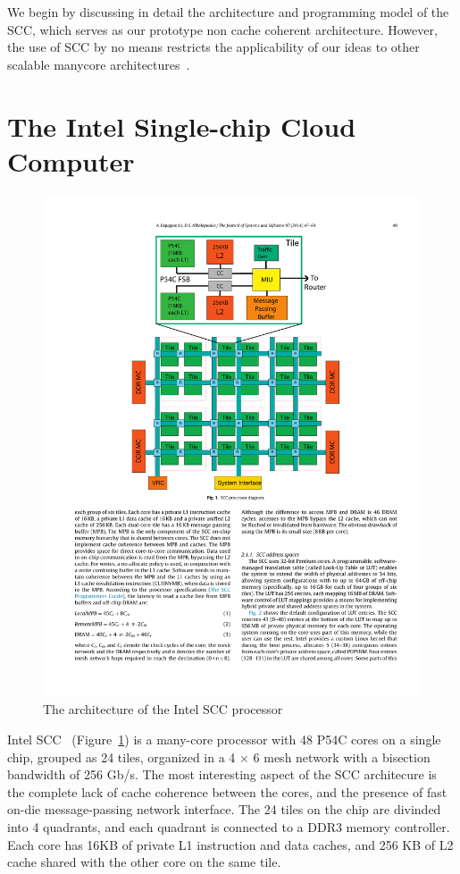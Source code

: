 We begin by discussing in detail the architecture and programming model of the
SCC, which serves as our prototype non cache coherent architecture. However,
the use of SCC by no means restricts the applicability of our ideas to other
scalable manycore architectures~\cite{mmgc}.

\section{The Intel Single-chip Cloud Computer}

\begin{figure}
\begin{center}
\includegraphics{Figures/SCC.pdf}
\end{center}
\caption{The architecture of the Intel SCC processor}
\label{fig:scc}
\end{figure}

Intel SCC~\cite{Mattson2010} (Figure~\ref{fig:scc}) is a many-core processor
with 48 P54C cores on a single chip, grouped as 24 tiles, organized in a 4
$\times$ 6 mesh network with a bisection bandwidth of 256 Gb/s. The most
interesting aspect of the SCC architecure is the complete lack of cache
coherence between the cores, and the presence of fast on-die message-passing
network interface. The 24 tiles on the chip are divinded into 4 quadrants, and
each quadrant is connected to a DDR3 memory controller. Each core has 16KB of
private L1 instruction and data caches, and 256 KB of L2 cache shared with the
other core on the same tile.

